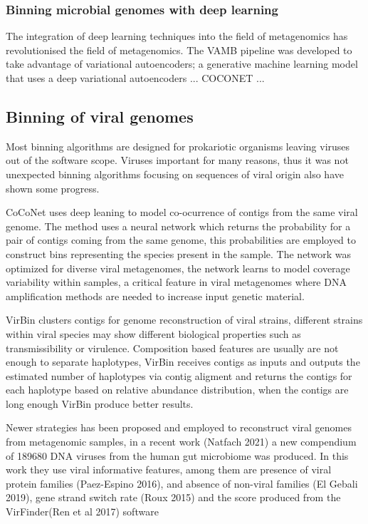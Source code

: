 \documentclass{article}
\begin{document}
\subsubsection{Binning microbial genomes with deep learning}
The integration of deep learning techniques into the field of metagenomics has revolutionised the field of metagenomics.
The \gls{VAMB} pipeline was developed to take advantage of variational autoencoders; a generative machine learning model that uses a deep variational autoencoders \cite{nissenimproved}...
COCONET \cite{arisdakessian2021coconet}...


\subsection{Binning of viral genomes}

Most binning algorithms are designed for prokariotic organisms leaving viruses out of the software scope. Viruses important for many reasons, thus it was not unexpected binning algorithms focusing on sequences of viral origin also have shown some progress. 

CoCoNet uses deep leaning to model co-ocurrence of contigs from the same viral genome. The method uses a neural network which returns the probability for a pair of contigs coming  from the same genome, this probabilities are employed to construct bins representing the species present in the sample. The network was optimized for diverse viral metagenomes, the network learns to model coverage variability within samples, a critical feature in viral metagenomes where DNA amplification methods are needed to increase input genetic material.

VirBin clusters contigs for genome reconstruction of viral strains, different strains within viral species may show different biological properties such as transmissibility or virulence. Composition based features are usually are not enough to separate haplotypes, VirBin receives contigs as inputs and outputs the estimated number of haplotypes via contig aligment and returns the contigs for each haplotype based on relative abundance distribution, when the contigs are long enough VirBin produce better results.

Newer strategies has been proposed and employed to reconstruct viral genomes from metagenomic samples, in a recent work (Natfach 2021) a new compendium of 189680 DNA viruses from the human gut microbiome was produced. In this work they use viral informative features, among them are presence of viral protein families (Paez-Espino 2016), and absence of non-viral families (El Gebali 2019), gene strand switch rate (Roux 2015) and the score produced from the VirFinder(Ren et al 2017) software  
\end{document}
